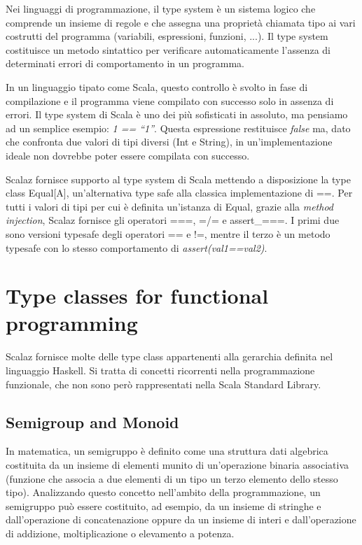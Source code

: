 Nei linguaggi di programmazione, il type system è un sistema logico che comprende un insieme di regole e che assegna una proprietà chiamata tipo ai vari costrutti del programma (variabili, espressioni, funzioni, ...). Il type system costituisce un metodo sintattico per verificare automaticamente l'assenza di determinati errori di comportamento in un programma.

In un linguaggio tipato come Scala, questo controllo è svolto in fase di compilazione e il programma viene compilato con successo solo in assenza di errori. Il type system di Scala è uno dei più sofisticati in assoluto, ma pensiamo ad un semplice esempio: \textit{1 == ``1''}. Questa espressione restituisce \textit{false} ma, dato che confronta due valori di tipi diversi (Int e String), in un'implementazione ideale non dovrebbe poter essere compilata con successo.

Scalaz fornisce supporto al type system di Scala mettendo a disposizione la type class Equal[A], un'alternativa type safe alla classica implementazione di ==. Per tutti i valori di tipi per cui è definita un'istanza di Equal, grazie alla \textit{method injection}, Scalaz fornisce gli operatori ===, =/= e assert\_===. I primi due sono versioni typesafe degli operatori == e !=, mentre il terzo è un metodo typesafe con lo stesso comportamento di \textit{assert(val1==val2)}.




\section{Type classes for functional programming}

Scalaz fornisce molte delle type class appartenenti alla gerarchia definita nel linguaggio Haskell. Si tratta di concetti ricorrenti nella programmazione funzionale, che non sono però rappresentati nella Scala Standard Library.

\subsection{Semigroup and Monoid}

In matematica, un semigruppo è definito come una struttura dati algebrica costituita da un insieme di elementi munito di un'operazione binaria associativa (funzione che associa a due elementi di un tipo un terzo elemento dello stesso tipo). Analizzando questo concetto nell'ambito della programmazione, un semigruppo può essere costituito, ad esempio, da un insieme di stringhe e dall'operazione di concatenazione oppure da un insieme di interi e dall'operazione di addizione, moltiplicazione o elevamento a potenza.

